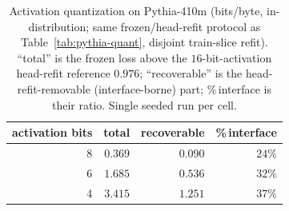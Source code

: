 \documentclass[twocolumn,10pt]{article}
\theoremstyle{definition}
\theoremstyle{remark}
\begin{document}
\begin{table}[H]
\centering
\small
\caption{Activation quantization on Pythia-410m (bits/byte,
in-distribution; same frozen/head-refit protocol as
Table~\ref{tab:pythia-quant}, disjoint train-slice refit). ``total'' is
the frozen loss above the
$16$-bit-activation head-refit reference $0.976$; ``recoverable'' is
the head-refit-removable (interface-borne) part; \%\,interface is their
ratio. Single seeded run per cell.}
\label{tab:pythia-actquant}
\begin{tabular}{rrrr}
\toprule
activation bits & total & recoverable & \%\,interface \\
\midrule
8 & $0.369$ & $0.090$ & $24\%$ \\
6 & $1.685$ & $0.536$ & $32\%$ \\
4 & $3.415$ & $1.251$ & $37\%$ \\
\bottomrule
\end{tabular}
\end{table}
\end{document}
